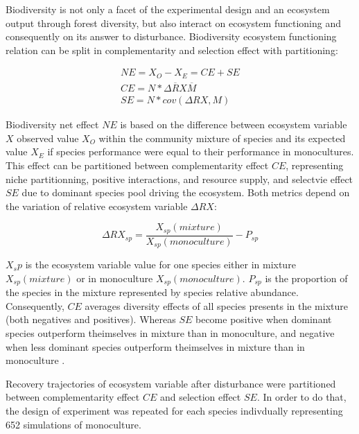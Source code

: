 \documentclass[12pt,]{article}
\theoremstyle{definition}
\theoremstyle{definition}
\theoremstyle{remark}
\begin{document}
Biodiversity is not only a facet of the experimental design and an
ecosystem output through forest diversity, but also interact on
ecosystem functioning and consequently on its answer to disturbance.
Biodiversity ecosystem functioning relation can be split in
complementarity and selection effect with \citet{Loreau2001}
partitioning:

\begin{equation}
  \begin{array}{c}
    NE = X_O - X_E = CE + SE \\
    CE = N* \overline{\Delta RX} \overline{M}\\
    SE = N*cov(\Delta RX,M)
  \end{array}
  \label{eq:BiodivPart}
\end{equation}

Biodiversity net effect \(NE\) is based on the difference between
ecosystem variable \(X\) observed value \(X_O\) within the community
mixture of species and its expected value \(X_E\) if species performance
were equal to their performance in monocultures. This effect can be
partitioned between complementarity effect \(CE\), representing niche
partitionning, positive interactions, and resource supply, and selectvie
effect \(SE\) due to dominant species pool driving the ecosystem. Both
metrics depend on the variation of relative ecosystem variable
\(\Delta RX\):

\begin{equation}
  \Delta RX_{sp} = \frac{X_{sp}(mixture)}{X_{sp}(monoculture)} - P_{sp}
  \label{eq:DeltaRY}
\end{equation}

\(X_sp\) is the ecosystem variable value for one species either in
mixture \(X_{sp}(mixture)\) or in monoculture \(X_{sp}(monoculture)\).
\(P_{sp}\) is the proportion of the species in the mixture represented
by species relative abundance. Consequently, \(CE\) averages diversity
effects of all species presents in the mixture (both negatives and
positives). Whereas \(SE\) become positive when dominant species
outperform theimselves in mixture than in monoculture, and negative when
less dominant species outperform theimselves in mixture than in
monoculture \citep{Tobner2016}.

Recovery trajectories of ecosystem variable after disturbance were
partitioned between complementarity effect \(CE\) and selection effect
\(SE\). In order to do that, the design of experiment was repeated for
each species indivdually representing 652 simulations of monoculture.
\end{document}
